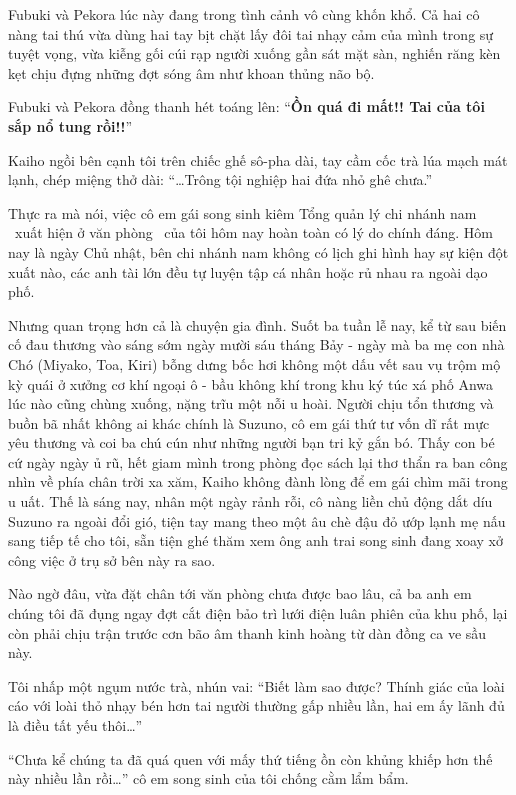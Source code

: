 \documentclass[../main.tex]{subfiles}
\begin{document}
Fubuki và Pekora lúc này đang trong tình cảnh vô cùng khốn khổ. Cả hai cô nàng tai thú vừa dùng hai tay bịt chặt lấy đôi tai nhạy cảm của mình trong sự tuyệt vọng, vừa kiễng gối cúi rạp người xuống gần sát mặt sàn, nghiến răng kèn kẹt chịu đựng những đợt sóng âm như khoan thủng não bộ.


Fubuki và Pekora đồng thanh hét toáng lên: ``\textbf{Ồn quá đi mất!! Tai của tôi sắp nổ tung rồi!!}''

Kaiho ngồi bên cạnh tôi trên chiếc ghế sô-pha dài, tay cầm cốc trà lúa mạch mát lạnh, chép miệng thở dài: ``\dots Trông tội nghiệp hai đứa nhỏ ghê chưa.''

Thực ra mà nói, việc cô em gái song sinh kiêm Tổng quản lý chi nhánh nam \hls\ xuất hiện ở văn phòng \hll\ của tôi hôm nay hoàn toàn có lý do chính đáng. Hôm nay là ngày Chủ nhật, bên chi nhánh nam không có lịch ghi hình hay sự kiện đột xuất nào, các anh tài lớn đều tự luyện tập cá nhân hoặc rủ nhau ra ngoài dạo phố.

Nhưng quan trọng hơn cả là chuyện gia đình. Suốt ba tuần lễ nay, kể từ sau biến cố đau thương vào sáng sớm ngày mười sáu tháng Bảy - ngày mà ba mẹ con nhà Chó (Miyako, Toa, Kiri) bỗng dưng bốc hơi không một dấu vết sau vụ trộm mộ kỳ quái ở xưởng cơ khí ngoại ô - bầu không khí trong khu ký túc xá phố Anwa lúc nào cũng chùng xuống, nặng trĩu một nỗi u hoài. Người chịu tổn thương và buồn bã nhất không ai khác chính là Suzuno, cô em gái thứ tư vốn dĩ rất mực yêu thương và coi ba chú cún như những người bạn tri kỷ gắn bó. Thấy con bé cứ ngày ngày ủ rũ, hết giam mình trong phòng đọc sách lại thơ thẩn ra ban công nhìn về phía chân trời xa xăm, Kaiho không đành lòng để em gái chìm mãi trong u uất. Thế là sáng nay, nhân một ngày rảnh rỗi, cô nàng liền chủ động dắt díu Suzuno ra ngoài đổi gió, tiện tay mang theo một âu chè đậu đỏ ướp lạnh mẹ nấu sang tiếp tế cho tôi, sẵn tiện ghé thăm xem ông anh trai song sinh đang xoay xở công việc ở trụ sở bên này ra sao.

Nào ngờ đâu, vừa đặt chân tới văn phòng chưa được bao lâu, cả ba anh em chúng tôi đã đụng ngay đợt cắt điện bảo trì lưới điện luân phiên của khu phố, lại còn phải chịu trận trước cơn bão âm thanh kinh hoàng từ dàn đồng ca ve sầu này.

Tôi nhấp một ngụm nước trà, nhún vai: ``Biết làm sao được? Thính giác của loài cáo với loài thỏ nhạy bén hơn tai người thường gấp nhiều lần, hai em ấy lãnh đủ là điều tất yếu thôi\dots''

``Chưa kể chúng ta đã quá quen với mấy thứ tiếng ồn còn khủng khiếp hơn thế này nhiều lần rồi\dots'' cô em song sinh của tôi chống cằm lẩm bẩm.
\end{document}

